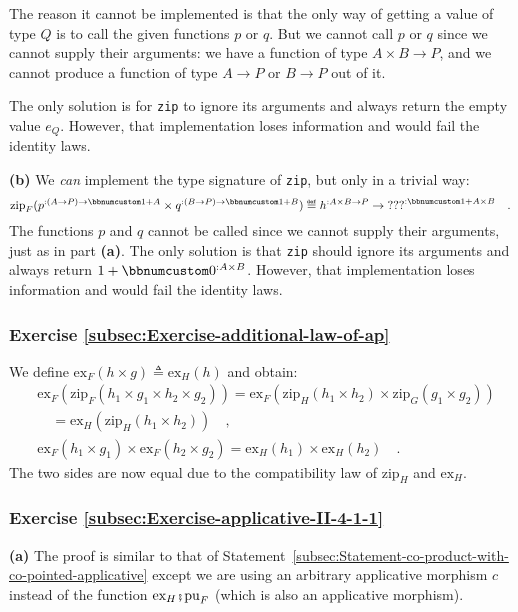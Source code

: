 The reason it cannot be implemented is that the only way of getting
a value of type $Q$ is to call the given functions $p$ or $q$.
But we cannot call $p$ or $q$ since we cannot supply their arguments:
we have a function of type $A\times B\rightarrow P$, and we cannot
produce a function of type $A\rightarrow P$ or $B\rightarrow P$
out of it.

The only solution is for \lstinline!zip! to ignore its arguments
and always return the empty value $e_{Q}$. However, that implementation
loses information and would fail the identity laws.

\textbf{(b)} We \emph{can} implement the type signature of \lstinline!zip!,
but only in a trivial way:
\[
\text{zip}_{F}(p^{:(A\rightarrow P)\rightarrow\bbnum 1+A}\times q^{:(B\rightarrow P)\rightarrow\bbnum 1+B})\triangleq h^{:A\times B\rightarrow P}\rightarrow\text{???}^{:\bbnum 1+A\times B}\quad.
\]
The functions $p$ and $q$ cannot be called since we cannot supply
their arguments, just as in part \textbf{(a)}. The only solution is
that \lstinline!zip! should ignore its arguments and always return
$1+\bbnum 0^{:A\times B}$. However, that implementation loses information
and would fail the identity laws.

\subsubsection*{Exercise \ref{subsec:Exercise-additional-law-of-ap}}

We define $\text{ex}_{F}(h\times g)\triangleq\text{ex}_{H}(h)$ and
obtain:
\begin{align*}
 & \text{ex}_{F}(\text{zip}_{F}(h_{1}\times g_{1}\times h_{2}\times g_{2}))=\text{ex}_{F}(\text{zip}_{H}(h_{1}\times h_{2})\times\text{zip}_{G}(g_{1}\times g_{2}))\\
 & \quad=\text{ex}_{H}(\text{zip}_{H}(h_{1}\times h_{2}))\quad,\\
 & \text{ex}_{F}(h_{1}\times g_{1})\times\text{ex}_{F}(h_{2}\times g_{2})=\text{ex}_{H}(h_{1})\times\text{ex}_{H}(h_{2})\quad.
\end{align*}
The two sides are now equal due to the compatibility law of $\text{zip}_{H}$
and $\text{ex}_{H}$.

\subsubsection*{Exercise \ref{subsec:Exercise-applicative-II-4-1-1}}

\textbf{(a)} The proof is similar to that of Statement~\ref{subsec:Statement-co-product-with-co-pointed-applicative}
except we are using an arbitrary applicative morphism $c$ instead
of the function $\text{ex}_{H}\bef\text{pu}_{F}$ (which is also an
applicative morphism).

